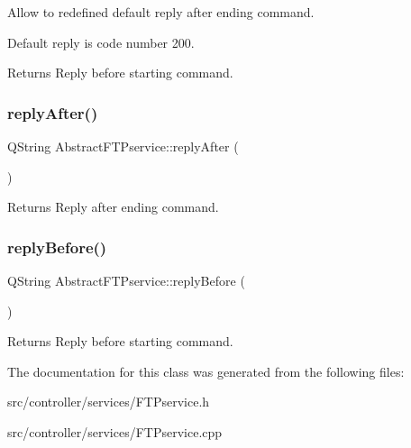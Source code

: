 Allow to redefined default reply after ending command. 

Default reply is code number 200. \begin{DoxyReturn}{Returns}
Reply before starting command. 
\end{DoxyReturn}
\mbox{\label{classAbstractFTPservice_aa689acc6cb72ed5255a1ca407059be83}} 
\subsubsection{\texorpdfstring{reply\+After()}{replyAfter()}}
{\footnotesize\ttfamily Q\+String Abstract\+F\+T\+Pservice\+::reply\+After (\begin{DoxyParamCaption}{ }\end{DoxyParamCaption})}

\begin{DoxyReturn}{Returns}
Reply after ending command. 
\end{DoxyReturn}
\mbox{\label{classAbstractFTPservice_a48c4d339fde37882e48fc9e007184e2f}} 
\subsubsection{\texorpdfstring{reply\+Before()}{replyBefore()}}
{\footnotesize\ttfamily Q\+String Abstract\+F\+T\+Pservice\+::reply\+Before (\begin{DoxyParamCaption}{ }\end{DoxyParamCaption})}

\begin{DoxyReturn}{Returns}
Reply before starting command. 
\end{DoxyReturn}


The documentation for this class was generated from the following files\+:\begin{DoxyCompactItemize}
\item 
src/controller/services/F\+T\+Pservice.\+h\item 
src/controller/services/F\+T\+Pservice.\+cpp\end{DoxyCompactItemize}
